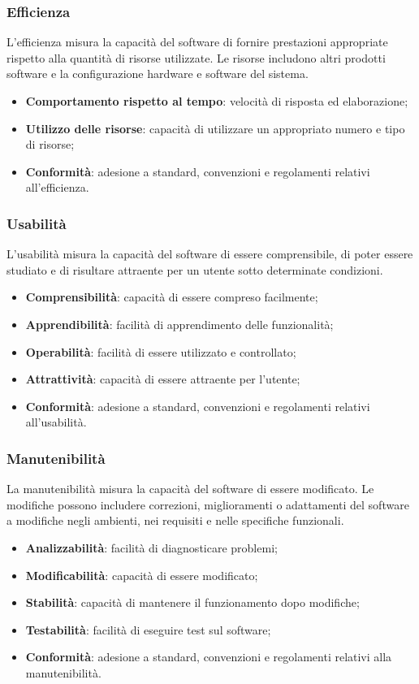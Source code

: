 \subsubsection{Efficienza}
L'efficienza misura la capacità del software di fornire prestazioni appropriate rispetto alla quantità di risorse utilizzate.
Le risorse includono altri prodotti software e la configurazione hardware e software del sistema.
\begin{itemize}
    \item \textbf{Comportamento rispetto al tempo}: velocità di risposta ed elaborazione;
    \item \textbf{Utilizzo delle risorse}: capacità di utilizzare un appropriato numero e tipo di risorse;
    \item \textbf{Conformità}: adesione a standard, convenzioni e regolamenti relativi all'efficienza.
\end{itemize}

\subsubsection{Usabilità}
L'usabilità misura la capacità del software di essere comprensibile, di poter essere
studiato e di risultare attraente per un utente sotto determinate condizioni.
\begin{itemize}
    \item \textbf{Comprensibilità}: capacità di essere compreso facilmente;
    \item \textbf{Apprendibilità}: facilità di apprendimento delle funzionalità;
    \item \textbf{Operabilità}: facilità di essere utilizzato e controllato;
    \item \textbf{Attrattività}: capacità di essere attraente per l'utente;
    \item \textbf{Conformità}: adesione a standard, convenzioni e regolamenti relativi all'usabilità.
\end{itemize}

\subsubsection{Manutenibilità}
La manutenibilità misura la capacità del software di essere modificato.
Le modifiche possono includere correzioni, miglioramenti o adattamenti del software
a modifiche negli ambienti, nei requisiti e nelle specifiche funzionali.
\begin{itemize}
    \item \textbf{Analizzabilità}: facilità di diagnosticare problemi;
    \item \textbf{Modificabilità}: capacità di essere modificato;
    \item \textbf{Stabilità}: capacità di mantenere il funzionamento dopo modifiche;
    \item \textbf{Testabilità}: facilità di eseguire test sul software;
    \item \textbf{Conformità}: adesione a standard, convenzioni e regolamenti relativi alla manutenibilità.
\end{itemize}

